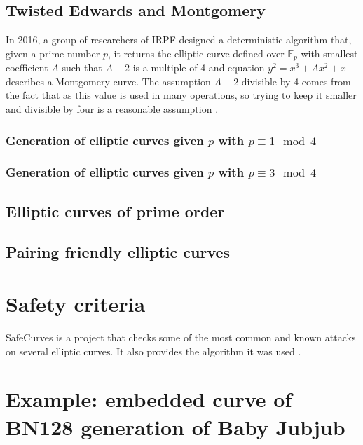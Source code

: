 \documentclass{article}
\newcommand{\Fp}{\ensuremath{\mathbb{F}_p}}
\begin{document}
\begin{spacing}{1.2}
	\subsection{Twisted Edwards and Montgomery}
				
		In 2016, a group of researchers of IRPF designed a deterministic algorithm that, given a prime number $p$, it returns the elliptic curve defined over $\Fp$ with smallest coefficient $A$ such that $A-2$ is a multiple of 4 and equation $y^2 = x^3 + Ax^2 + x$ describes a Montgomery curve. 
		The assumption $A-2$ divisible by 4 comes from the fact that as this value is used in many operations, so trying to keep it smaller and divisible by four is a reasonable assumption \cite{generation-baby}.
		
		\subsubsection{Generation of elliptic curves given $p$ with $p\equiv1\mod4$}
		\vspace{0.5cm}
				
		\subsubsection{Generation of elliptic curves given $p$ with $p\equiv3\mod4$}
		
	\subsection{Elliptic curves of prime order}
	
	\subsection{Pairing friendly elliptic curves}

\section{Safety criteria}
	SafeCurves is a project that checks some of the most common and known attacks on several elliptic curves. It also provides the algorithm it was used \cite{safe-curves}.

\section{Example: embedded curve of BN128 generation of Baby Jubjub}
	

\end{spacing}
\end{document}
